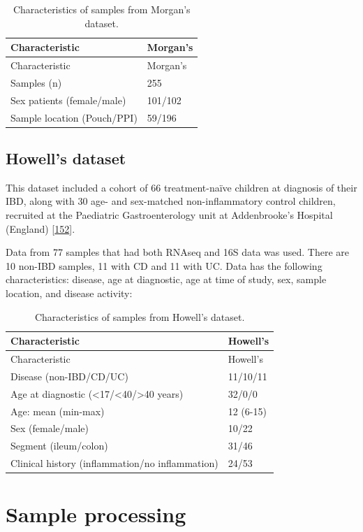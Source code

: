 \documentclass[
  a4paper,
]{book}
\begin{document}
\begin{longtable}[]{@{}ll@{}}
\caption{\label{tab:Morgan} Characteristics of samples from Morgan's dataset.}\tabularnewline
\toprule
Characteristic & Morgan's \\
\midrule
\endfirsthead
\toprule
Characteristic & Morgan's \\
\midrule
\endhead
Samples (n) & 255 \\
Sex patients (female/male) & 101/102 \\
Sample location (Pouch/PPI) & 59/196 \\
\bottomrule
\end{longtable}

\hypertarget{methods-howell}{%
\subsection{Howell's dataset}\label{methods-howell}}

This dataset included a cohort of 66 treatment-naïve children at diagnosis of their IBD, along with 30 age- and sex-matched non-inflammatory control children, recruited at the Paediatric Gastroenterology unit at Addenbrooke's Hospital (England) {[}\protect\hyperlink{ref-howell2018}{152}{]}.

Data from 77 samples that had both RNAseq and 16S data was used.
There are 10 non-IBD samples, 11 with CD and 11 with UC.
Data has the following characteristics: disease, age at diagnostic, age at time of study, sex, sample location, and disease activity:

\begin{longtable}[]{@{}ll@{}}
\caption{\label{tab:howell} Characteristics of samples from Howell's dataset.}\tabularnewline
\toprule
Characteristic & Howell's \\
\midrule
\endfirsthead
\toprule
Characteristic & Howell's \\
\midrule
\endhead
Disease (non-IBD/CD/UC) & 11/10/11 \\
Age at diagnostic (\textless17/\textless40/\textgreater40 years) & 32/0/0 \\
Age: mean (min-max) & 12 (6-15) \\
Sex (female/male) & 10/22 \\
Segment (ileum/colon) & 31/46 \\
Clinical history (inflammation/no inflammation) & 24/53 \\
\bottomrule
\end{longtable}

\hypertarget{processing}{%
\section{Sample processing}\label{processing}}
\end{document}
